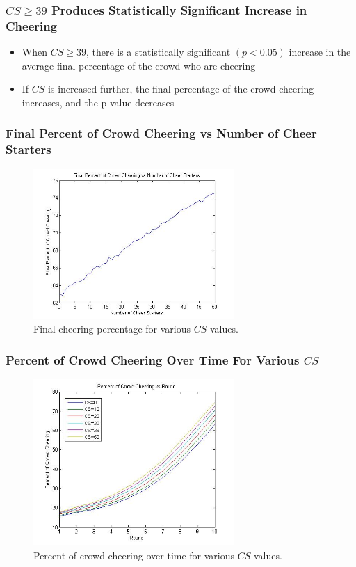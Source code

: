 \documentclass[compress,handout,10pt]{beamer}
\let\olditem\item
\renewcommand{\item}{\setlength{\itemsep}{0.5\baselineskip}\olditem}
\begin{document}
\begin{frame}
	\frametitle{$CS\geq 39$ Produces Statistically Significant Increase in Cheering}
	\begin{itemize}
		\item When $CS\geq39$, there is a statistically significant $(p<0.05)$ increase in the average final percentage of the crowd who are cheering
		\item If $CS$ is increased further, the final percentage of the crowd cheering increases, and the p-value decreases
	\end{itemize}
\end{frame}

\begin{frame}
	\frametitle{Final Percent of Crowd Cheering vs Number of Cheer Starters}
	\begin{figure} [h]
		\begin{center}
    			\includegraphics [width=3in] {46(1).jpg}
    			\caption {{\tiny Final cheering percentage for various $CS$ values.}}
    		\end{center}
    	\end {figure}	
\end{frame}

\begin{frame}
	\frametitle{Percent of Crowd Cheering Over Time For Various $CS$}
	\begin{figure} [h]
		\begin{center}
    			\includegraphics [width=3in] {46(2).jpg}
    			\caption {{\tiny Percent of crowd cheering over time for various $CS$ values.}}
    		\end{center}
    	\end {figure}	
\end{frame}
\end{document}

